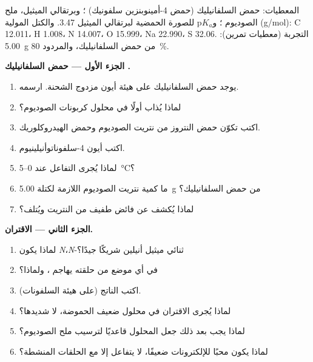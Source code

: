 \begin{problem}
\label{pb:b2:amines:1}
المعطيات: حمض السلفانيليك (حمض 4-أمينوبنزين سلفونيك) ؛ وبرتقالي الميثيل، ملح الصوديوم
؛ و$\mathrm pK_a$ للصورة الحمضية لبرتقالي الميثيل 3.47. والكتل المولية
(\unit{g/mol}): C 12.011، H 1.008، N 14.007، O 15.999، Na 22.990، S 32.06. التجربة (معطيات تمرين):
\qty{5.00}{g} من حمض السلفانيليك، والمردود 80~\%.

\medskip
\noindent\textbf{الجزء الأول --- حمض السلفانيليك .}
\begin{enumerate}
  \item يوجد حمض السلفانيليك على هيئة أيون مزدوج الشحنة. ارسمه.
  \item لماذا يُذاب أولًا في محلول كربونات الصوديوم؟
  \item اكتب تكوّن حمض النتروز من نتريت الصوديوم وحمض الهيدروكلوريك.
  \item اكتب  أيون 4-سلفوناتوأنيلينيوم.
  \item لماذا يُجرى التفاعل عند 0--\qty{5}{\degreeCelsius}؟
  \item ما كمية نتريت الصوديوم اللازمة لكتلة \qty{5.00}{g} من حمض السلفانيليك؟
  \item لماذا يُكشف عن فائض طفيف من النتريت ويُتلف؟
\end{enumerate}

\medskip
\noindent\textbf{الجزء الثاني --- الاقتران.}
\begin{enumerate}[resume]
  \item لماذا يكون \textit{N}،\textit{N}-ثنائي ميثيل أنيلين شريكًا جيدًا؟
  \item في أي موضع من حلقته يهاجم ، ولماذا؟
  \item اكتب الناتج (على هيئة السلفونات).
  \item لماذا يُجرى الاقتران في محلول ضعيف الحموضة، لا شديدها؟
  \item لماذا يجب بعد ذلك جعل المحلول قاعديًا لترسيب ملح الصوديوم؟
  \item لماذا يكون  محبًا للإلكترونات ضعيفًا، لا يتفاعل إلا مع الحلقات المنشطة؟
\end{enumerate}


\end{problem}
